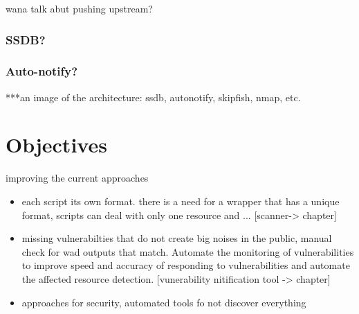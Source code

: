 \label{wad_section}
wana talk abut pushing upstream?
\subsubsection{SSDB?}
\subsubsection{Auto-notify?}

***an image of the architecture: ssdb, autonotify, skipfish, nmap, etc.


\section{Objectives}
improving the current approaches
\begin{itemize}
\item each script its own format. there is a need for a wrapper that has a unique format, scripts can deal with only one resource and ... [scanner-> chapter]
\item missing vulnerabilties that do not create big noises in the public, manual check for wad outputs that match. Automate the monitoring of vulnerabilities to improve speed and accuracy of responding to vulnerabilities and automate the affected resource detection. [vunerability nitification tool -> chapter]

\item approaches for security, automated tools fo not discover everything
\end{itemize}


























